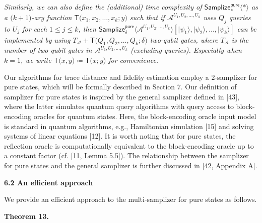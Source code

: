 \documentclass[10pt,a4paper]{article}
\begin{document}
\emph{Similarly, we can also define the (additional) time complexity of $\mathsf{Samplize}^{\mathsf{pure}}_{*}\langle*\rangle$ as a $\lparen k+1\rparen$-ary function $\mathsf{T}\lparen x_{1},x_{2},\dots,x_{k};y\rparen$ such that if $\mathcal{A}^{U_{1},U_{2},\dots,U_{k}}$ uses $Q_{j}$ queries to $U_{j}$ for each $1\leq j\leq k$, then $\mathsf{Samplize}^{\mathsf{pure}}_{\delta}\langle\mathcal{A}^{U_{1},U_{2},\dots,U_{k}}\rangle[\lvert\psi_{1}\rangle,\lvert\psi_{2}\rangle,\dots,\lvert\psi_{k}\rangle]$ can be implemented by using $T_{\mathcal{A}}+\mathsf{T}\lparen Q_{1},Q_{2},\dots,Q_{k};\delta\rparen$ two-qubit gates, where $T_{\mathcal{A}}$ is the number of two-qubit gates in $\mathcal{A}^{U_{1},U_{2},\dots,U_{k}}$ (excluding queries).
Especially when $k=1$, we write $\mathsf{T}\lparen x,y\rparen\coloneqq\mathsf{T}\lparen x;y\rparen$ for convenience.}\par






Our algorithms for trace distance and fidelity estimation employ a $2$-samplizer for pure states, which will be formally described in Section 7.
Our definition of samplizer for pure states is inspired by the general samplizer defined in [43], where the latter simulates quantum query algorithms with query access to block-encoding oracles for quantum states.
Here, the block-encoding oracle input model is standard in quantum algorithms, e.g., Hamiltonian simulation [15] and solving systems of linear equations [12].
It is worth noting that for pure states, the reflection oracle is computationally equivalent to the block-encoding oracle up to a constant factor (cf. [11, Lemma 5.5]).
The relationship between the samplizer for pure states and the general samplizer is further discussed in [42, Appendix A].\par





\par\medskip\noindent\textbf{
6.2 An efficient approach}\par




We provide an efficient approach to the multi-samplizer for pure states as follows.\par





\par\medskip\noindent\textbf{
\textbf{Theorem 13}\textbf{.}
}\par
\end{document}
